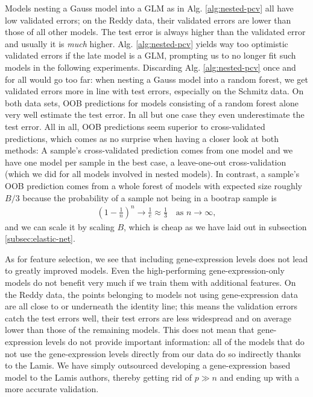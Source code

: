 Models 
nesting a Gauss model into a GLM as in Alg. \ref{alg:nested-pcv} all have low validated errors; on 
the Reddy data, their validated errors are lower than those of all other models. The test error is 
always higher than the validated error and usually it is \textit{much} higher. Alg. \ref{alg:nested-pcv} 
yields way too optimistic validated errors if the late model is a GLM, prompting us to no longer 
fit such models in the following experiments. Discarding Alg. \ref{alg:nested-pcv} once and for all
would go too far: when nesting a Gauss model into a random forest, we get validated errors more in 
line with test errors, especially on the Schmitz data. On both data sets, OOB predictions for 
models consisting of a random forest alone very well estimate the test error. In all but one case 
they even underestimate the test error. All in all, OOB predictions seem superior to 
cross-validated predictions, which comes as no surprise when having a closer look at both 
methods: A sample's cross-validated prediction comes from one model and we have one model per 
sample in the best case, a leave-one-out cross-validation (which we did for all models involved in 
nested models). In contrast, a sample's OOB prediction comes from a whole forest of models with 
expected size roughly $B/3$ because the probability of a sample not being in a bootrap sample 
is
\begin{align}
    \left( 1 - \frac{1}{n} \right)^n \to \frac{1}{e} \approx \frac{1}{3} \quad \text{as } n \to 
    \infty,
\end{align}
and we can scale it by scaling $B$, which is cheap as we have laid out in subsection 
\ref{subsec:elastic-net}.

As for feature selection, we see that including gene-expression levels does not lead to greatly 
improved models. Even the high-performing gene-expression-only models do not benefit very much if 
we train them with additional features. On the Reddy data, the points belonging to models not using 
gene-expression data are all close to or underneath the identity line; this means the validation 
errors 
catch the test errors well, their test errors are less widespread and on average lower than those 
of the remaining models. This does not mean that gene-expression levels do not provide important 
information: all of the models that do not use the gene-expression levels directly from our data 
do so indirectly thanks to the Lamis. We have simply outsourced developing a gene-expression based 
model to the Lamis authors, thereby getting rid of $p \gg n$ and ending up with a more accurate 
validation.

